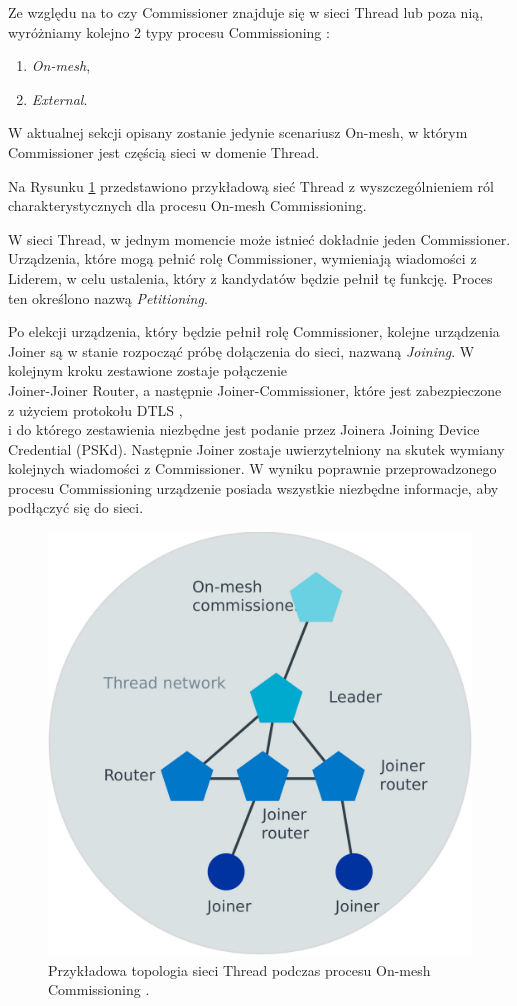     Ze względu na to czy Commissioner znajduje się w sieci Thread lub poza nią, wyróżniamy kolejno 2 typy procesu Commissioning \cite{thread-commissioning}:
    \begin{enumerate}
        \item \textit{On-mesh},
        \item \textit{External}.
    \end{enumerate}

    W aktualnej sekcji opisany zostanie jedynie scenariusz On-mesh, w którym Commissioner jest częścią sieci w domenie Thread.

    Na Rysunku \ref{fig:thread-on-mesh-commissioning} przedstawiono przykładową sieć Thread z wyszczególnieniem ról charakterystycznych dla procesu On-mesh Commissioning.

    W sieci Thread, w jednym momencie może istnieć dokładnie jeden Commissioner. Urządzenia, które mogą pełnić rolę Commissioner, wymieniają wiadomości z Liderem, w celu ustalenia, który z kandydatów będzie pełnił tę funkcję. Proces ten określono nazwą \textit{Petitioning}.

    Po elekcji urządzenia, który będzie pełnił rolę Commissioner, kolejne urządzenia Joiner są w stanie rozpocząć próbę dołączenia do sieci, nazwaną \textit{Joining}.
    W kolejnym kroku zestawione zostaje połączenie \\ Joiner-Joiner Router, a następnie Joiner-Commissioner, które jest zabezpieczone z użyciem protokołu DTLS ,\\ i do którego zestawienia niezbędne jest podanie przez Joinera Joining Device Credential (PSKd). Następnie Joiner zostaje uwierzytelniony na skutek wymiany kolejnych wiadomości z Commissioner. W wyniku poprawnie przeprowadzonego procesu Commissioning urządzenie posiada wszystkie niezbędne informacje, aby podłączyć się do sieci.

    \begin{figure}[H]
        \centering
        \includegraphics[width=0.8\linewidth]{graphics/external/Thread_on-mesh_commissioning.jpg}
        \caption{Przykładowa topologia sieci Thread podczas procesu On-mesh Commissioning \cite{thread-commissioning}.}
        \label{fig:thread-on-mesh-commissioning}
    \end{figure}

